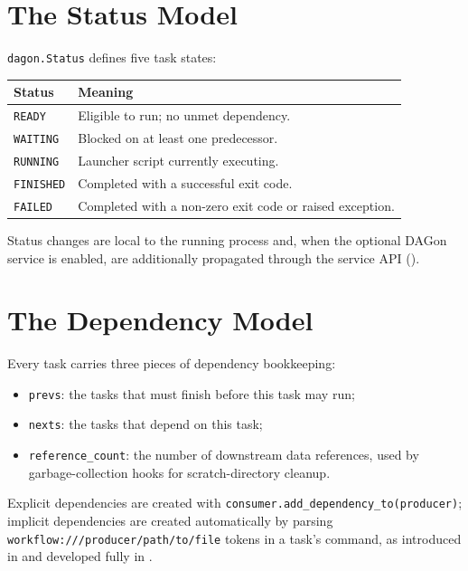 \section{The Status Model}
\label{sec:status-model}

\texttt{dagon.Status} defines five task states:

\begin{center}
\begin{tabular}{@{}ll@{}}
\toprule
\textbf{Status} & \textbf{Meaning} \\
\midrule
\texttt{READY}    & Eligible to run; no unmet dependency. \\
\texttt{WAITING}  & Blocked on at least one predecessor. \\
\texttt{RUNNING}  & Launcher script currently executing. \\
\texttt{FINISHED} & Completed with a successful exit code. \\
\texttt{FAILED}   & Completed with a non-zero exit code or raised exception. \\
\bottomrule
\end{tabular}
\end{center}

Status changes are local to the running process and, when the optional
DAGon service is enabled, are additionally propagated through the service
API ().

\section{The Dependency Model}

Every task carries three pieces of dependency bookkeeping:

\begin{itemize}[leftmargin=1.4em]
  \item \texttt{prevs}: the tasks that must finish before this task may run;
  \item \texttt{nexts}: the tasks that depend on this task;
  \item \texttt{reference\_count}: the number of downstream data references,
    used by garbage-collection hooks for scratch-directory cleanup.
\end{itemize}

Explicit dependencies are created with \texttt{consumer.add\_dependency\_to(producer)};
implicit dependencies are created automatically by parsing
\texttt{workflow:///producer/path/to/file} tokens in a task's command, as
introduced in  and developed fully in
.


